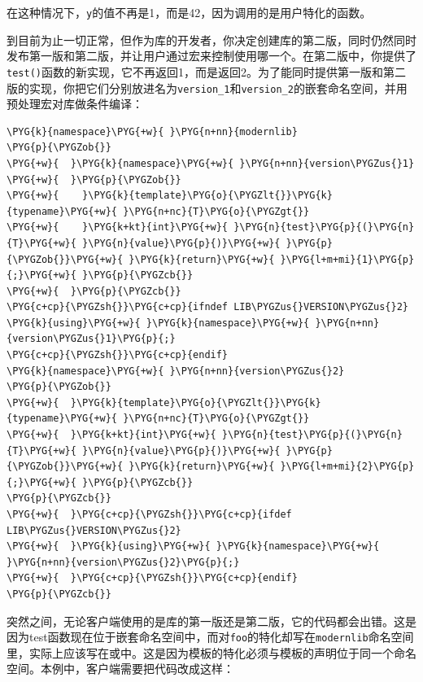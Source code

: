 
在这种情况下，\texttt{y}的值不再是1，而是42，因为调用的是用户特化的函数。



到目前为止一切正常，但作为库的开发者，你决定创建库的第二版，同时仍然同时发布第一版和第二版，并让用户通过宏来控制使用哪一个。在第二版中，你提供了\texttt{test()}函数的新实现，它不再返回1，而是返回2。为了能同时提供第一版和第二版的实现，你把它们分别放进名为\texttt{version\_\allowbreak{}1}和\texttt{version\_\allowbreak{}2}的嵌套命名空间，并用预处理宏对库做条件编译：



\begin{codeblockbg}
\begin{Verbatim}[commandchars=\\\{\},breaklines=true,breakanywhere=true,fontsize=\codefont,xleftmargin=17bp]
\PYG{k}{namespace}\PYG{+w}{ }\PYG{n+nn}{modernlib}
\PYG{p}{\PYGZob{}}
\PYG{+w}{  }\PYG{k}{namespace}\PYG{+w}{ }\PYG{n+nn}{version\PYGZus{}1}
\PYG{+w}{  }\PYG{p}{\PYGZob{}}
\PYG{+w}{    }\PYG{k}{template}\PYG{o}{\PYGZlt{}}\PYG{k}{typename}\PYG{+w}{ }\PYG{n+nc}{T}\PYG{o}{\PYGZgt{}}
\PYG{+w}{    }\PYG{k+kt}{int}\PYG{+w}{ }\PYG{n}{test}\PYG{p}{(}\PYG{n}{T}\PYG{+w}{ }\PYG{n}{value}\PYG{p}{)}\PYG{+w}{ }\PYG{p}{\PYGZob{}}\PYG{+w}{ }\PYG{k}{return}\PYG{+w}{ }\PYG{l+m+mi}{1}\PYG{p}{;}\PYG{+w}{ }\PYG{p}{\PYGZcb{}}
\PYG{+w}{  }\PYG{p}{\PYGZcb{}}
\PYG{c+cp}{\PYGZsh{}}\PYG{c+cp}{ifndef LIB\PYGZus{}VERSION\PYGZus{}2}
\PYG{k}{using}\PYG{+w}{ }\PYG{k}{namespace}\PYG{+w}{ }\PYG{n+nn}{version\PYGZus{}1}\PYG{p}{;}
\PYG{c+cp}{\PYGZsh{}}\PYG{c+cp}{endif}
\PYG{k}{namespace}\PYG{+w}{ }\PYG{n+nn}{version\PYGZus{}2}
\PYG{p}{\PYGZob{}}
\PYG{+w}{  }\PYG{k}{template}\PYG{o}{\PYGZlt{}}\PYG{k}{typename}\PYG{+w}{ }\PYG{n+nc}{T}\PYG{o}{\PYGZgt{}}
\PYG{+w}{  }\PYG{k+kt}{int}\PYG{+w}{ }\PYG{n}{test}\PYG{p}{(}\PYG{n}{T}\PYG{+w}{ }\PYG{n}{value}\PYG{p}{)}\PYG{+w}{ }\PYG{p}{\PYGZob{}}\PYG{+w}{ }\PYG{k}{return}\PYG{+w}{ }\PYG{l+m+mi}{2}\PYG{p}{;}\PYG{+w}{ }\PYG{p}{\PYGZcb{}}
\PYG{p}{\PYGZcb{}}
\PYG{+w}{  }\PYG{c+cp}{\PYGZsh{}}\PYG{c+cp}{ifdef LIB\PYGZus{}VERSION\PYGZus{}2}
\PYG{+w}{  }\PYG{k}{using}\PYG{+w}{ }\PYG{k}{namespace}\PYG{+w}{ }\PYG{n+nn}{version\PYGZus{}2}\PYG{p}{;}
\PYG{+w}{  }\PYG{c+cp}{\PYGZsh{}}\PYG{c+cp}{endif}
\PYG{p}{\PYGZcb{}}
\end{Verbatim}
\end{codeblockbg}



突然之间，无论客户端使用的是库的第一版还是第二版，它的代码都会出错。这是因为test函数现在位于嵌套命名空间中，而对\texttt{foo}的特化却写在\texttt{modernlib}命名空间里，实际上应该写在或中。这是因为模板的特化必须与模板的声明位于同一个命名空间。本例中，客户端需要把代码改成这样：


